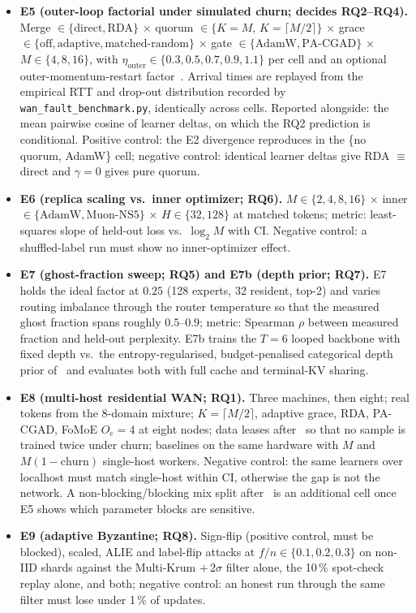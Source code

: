\documentclass[11pt,a4paper]{article}
\begin{document}
\begin{itemize}[leftmargin=1.8em]
    \item \textbf{E5 (outer-loop factorial under simulated churn; decides RQ2--RQ4).} Merge $\in\{\text{direct},\text{RDA}\}$ $\times$ quorum $\in\{K{=}M,\,K{=}\lceil M/2\rceil\}$ $\times$ grace $\in\{\text{off},\text{adaptive},\text{matched-random}\}$ $\times$ gate $\in\{\text{AdamW},\text{PA-CGAD}\}$ $\times$ $M\in\{4,8,16\}$, with $\eta_{\text{outer}}\in\{0.3,0.5,0.7,0.9,1.1\}$ per cell and an optional outer-momentum-restart factor~\cite{topollai2026restart}. Arrival times are replayed from the empirical RTT and drop-out distribution recorded by \texttt{wan\_fault\_benchmark.py}, identically across cells. Reported alongside: the mean pairwise cosine of learner deltas, on which the RQ2 prediction is conditional. Positive control: the E2 divergence reproduces in the \{no quorum, AdamW\} cell; negative control: identical learner deltas give RDA $\equiv$ direct and $\gamma=0$ gives pure quorum.
    \item \textbf{E6 (replica scaling vs.\ inner optimizer; RQ6).} $M\in\{2,4,8,16\}$ $\times$ inner $\in\{\text{AdamW},\text{Muon-NS5}\}$ $\times$ $H\in\{32,128\}$ at matched tokens; metric: least-squares slope of held-out loss vs.\ $\log_2 M$ with CI. Negative control: a shuffled-label run must show no inner-optimizer effect.
    \item \textbf{E7 (ghost-fraction sweep; RQ5) and E7b (depth prior; RQ7).} E7 holds the ideal factor at $0.25$ (128 experts, 32 resident, top-2) and varies routing imbalance through the router temperature so that the measured ghost fraction spans roughly $0.5$--$0.9$; metric: Spearman $\rho$ between measured fraction and held-out perplexity. E7b trains the $T=6$ looped backbone with fixed depth vs.\ the entropy-regularised, budget-penalised categorical depth prior of~\cite{loopedfp2026} and evaluates both with full cache and terminal-KV sharing.
    \item \textbf{E8 (multi-host residential WAN; RQ1).} Three machines, then eight; real tokens from the 8-domain mixture; $K=\lceil M/2\rceil$, adaptive grace, RDA, PA-CGAD, FoMoE $O_e=4$ at eight nodes; data leases after~\cite{palanciyan2026crossfacility} so that no sample is trained twice under churn; baselines on the same hardware with $M$ and $M(1-\text{churn})$ single-host workers. Negative control: the same learners over localhost must match single-host within CI, otherwise the gap is not the network. A non-blocking/blocking mix split after~\cite{koneputugodage2026factoredgossip,cagnasso2026gasloc} is an additional cell once E5 shows which parameter blocks are sensitive.
    \item \textbf{E9 (adaptive Byzantine; RQ8).} Sign-flip (positive control, must be blocked), scaled, ALIE and label-flip attacks at $f/n\in\{0.1,0.2,0.3\}$ on non-IID shards against the Multi-Krum $+\,2\sigma$ filter alone, the 10\,\% spot-check replay alone, and both; negative control: an honest run through the same filter must lose under 1\,\% of updates.
\end{itemize}
\end{document}

